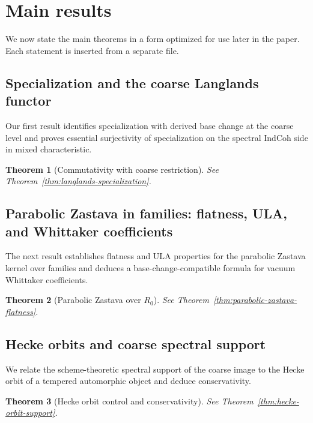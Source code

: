 \documentclass[11pt]{article}
\theoremstyle{plain}
\newtheorem{theorem}{Theorem}[section]
\theoremstyle{definition}
\theoremstyle{remark}
\begin{document}
\section{Main results}\label{sec:main}
We now state the main theorems in a form optimized for use later in the paper. Each statement is inserted from a separate file.

\subsection{Specialization and the coarse Langlands functor}
Our first result identifies specialization with derived base change at the coarse level and proves essential surjectivity of specialization on the spectral IndCoh side in mixed characteristic.

\begin{theorem}[Commutativity with coarse restriction] \label{thm:intro:coarse-specialization}
See Theorem~\ref{thm:langlands-specialization}.
\end{theorem}



\subsection{Parabolic Zastava in families: flatness, ULA, and Whittaker coefficients}
The next result establishes flatness and ULA properties for the parabolic Zastava kernel over families and deduces a base-change-compatible formula for vacuum Whittaker coefficients.

\begin{theorem}[Parabolic Zastava over $R_0$] \label{thm:intro:zastava}
See Theorem~\ref{thm:parabolic-zastava-flatness}.
\end{theorem}



\subsection{Hecke orbits and coarse spectral support}
We relate the scheme-theoretic spectral support of the coarse image to the Hecke orbit of a tempered automorphic object and deduce conservativity.

\begin{theorem}[Hecke orbit control and conservativity] \label{thm:intro:hecke}
See Theorem~\ref{thm:hecke-orbit-support}.
\end{theorem}
\end{document}
